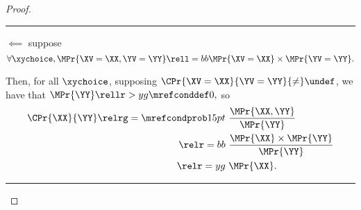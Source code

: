 \begin{proof}
  \hrule
  $\impliedby$ suppose 
  $$\forall \xychoice,
  \MPr{\XV = \XX, \YV = \YY} \rell = bb
  \MPr{\XV = \XX}
  \times
  \MPr{\YV = \YY}.$$

  Then, for all $\xychoice$, supposing $\CPr{\XV = \XX}{\YV = \YY} {\ne} \undef$, we have that
  $\MPr{\YY} \rellr > yg {\mrefconddef} 0,$
  so
  \begin{align*}
    \CPr{\XX}{\YY}
    \relrg = {\mrefcondprob} 15pt \ & 
    \frac{\MPr{\XX, \YY}}{\MPr{\YY}}
    \\
    \relr = bb \ & \frac{\MPr{\XX} \times \MPr{\YY}}{\MPr{\YY}}\\
    \relr = yg \ & \MPr{\XX}.
  \end{align*}
  \hrule
\end{proof}
